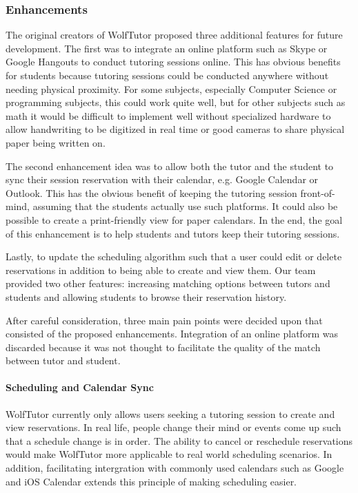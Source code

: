 \label{sec:possible-enhancements} 

\subsubsection{Enhancements} 
The original creators of WolfTutor proposed three additional features for future
development. The first was to integrate an online platform such as Skype or
Google Hangouts to conduct tutoring sessions online. This has obvious benefits
for students because tutoring sessions could be conducted anywhere without
needing physical proximity.  For some subjects, especially Computer Science or
programming subjects, this could work quite well, but for other subjects such as
math it would be difficult to implement well without specialized hardware to
allow handwriting to be digitized in real time or good cameras to share physical
paper being written on. 

The second enhancement idea was to allow both the tutor and the student to sync
their session reservation with their calendar, e.g. Google Calendar or Outlook.
This has the obvious benefit of keeping the tutoring session front-of-mind,
assuming that the students actually use such platforms.  It could also be
possible to create a print-friendly view for paper calendars. In the end, the
goal of this enhancement is to help students and tutors keep their tutoring
sessions.  

Lastly, to update the scheduling algorithm such that a user could edit or delete
reservations in addition to being able to create and view them. Our team
provided two other features: increasing matching options between tutors and
students and allowing students to browse their reservation history.

After careful consideration, three main pain points were decided upon that
consisted of the proposed enhancements. Integration of an online platform was
discarded because it was not thought to facilitate the quality of the match
between tutor and student.

\paragraph{Scheduling and Calendar Sync} WolfTutor currently only allows users
seeking a tutoring session to create and view reservations. In real life, people
change their mind or events come up such that a schedule change is in order. The
ability to cancel or reschedule reservations would make WolfTutor more
applicable to real world scheduling scenarios. In addition, facilitating
intergration with commonly used calendars such as Google and iOS Calendar
extends this principle of making scheduling easier.

